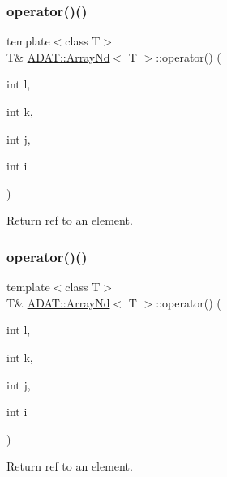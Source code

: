 \subsubsection{\texorpdfstring{operator()()}{operator()()}\hspace{0.1cm}{\footnotesize\ttfamily [19/24]}}
{\footnotesize\ttfamily template$<$class T$>$ \\
T\& \mbox{\hyperlink{classADAT_1_1ArrayNd}{A\+D\+A\+T\+::\+Array\+Nd}}$<$ T $>$\+::operator() (\begin{DoxyParamCaption}\item[{int}]{l,  }\item[{int}]{k,  }\item[{int}]{j,  }\item[{int}]{i }\end{DoxyParamCaption})\hspace{0.3cm}{\ttfamily [inline]}}



Return ref to an element. 

\mbox{\label{classADAT_1_1ArrayNd_a0d3dfd90a9e68964948dbccb48b18f1d}} 
\subsubsection{\texorpdfstring{operator()()}{operator()()}\hspace{0.1cm}{\footnotesize\ttfamily [20/24]}}
{\footnotesize\ttfamily template$<$class T$>$ \\
T\& \mbox{\hyperlink{classADAT_1_1ArrayNd}{A\+D\+A\+T\+::\+Array\+Nd}}$<$ T $>$\+::operator() (\begin{DoxyParamCaption}\item[{int}]{l,  }\item[{int}]{k,  }\item[{int}]{j,  }\item[{int}]{i }\end{DoxyParamCaption})\hspace{0.3cm}{\ttfamily [inline]}}



Return ref to an element. 

\mbox{\label{classADAT_1_1ArrayNd_a0d3dfd90a9e68964948dbccb48b18f1d}} 
